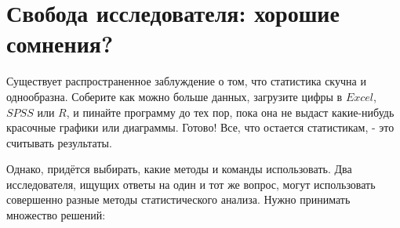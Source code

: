 \chapter{Свобода исследователя: хорошие сомнения? }
\label{chp8}

Существует распространенное заблуждение о том, что статистика скучна и однообразна. Соберите как можно больше данных, загрузите цифры в $Excel$, $SPSS$ или $R$, и пинайте программу до тех пор, пока она не выдаст какие-нибудь красочные графики или диаграммы. Готово! Все, что остается статистикам, - это считывать результаты.

Однако, придётся выбирать, какие методы и команды использовать. Два исследователя, ищущих ответы на один и тот же вопрос, могут использовать совершенно разные методы статистического анализа. Нужно принимать множество решений:


